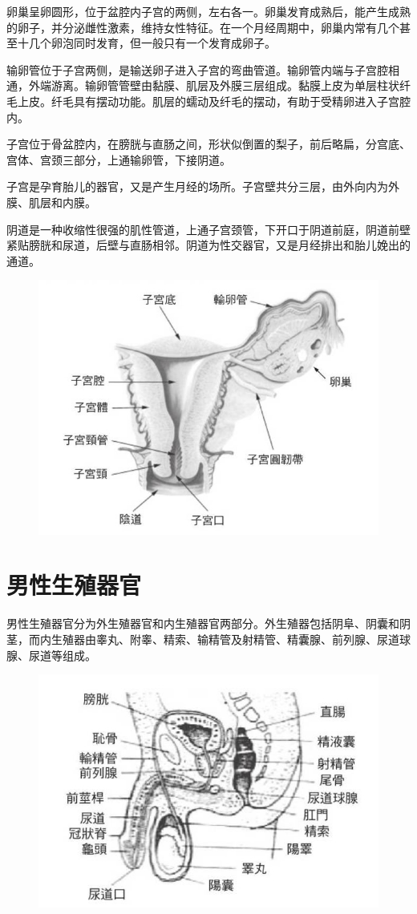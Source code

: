 \documentclass[12pt,UTF8]{ctexbook}
\begin{document}
卵巢呈卵圆形，位于盆腔内子宫的两侧，左右各一。卵巢发育成熟后，能产生成熟的卵子，并分泌雌性激素，维持女性特征。在一个月经周期中，卵巢内常有几个甚至十几个卵泡同时发育，但一般只有一个发育成卵子。

输卵管位于子宫两侧，是输送卵子进入子宫的弯曲管道。输卵管内端与子宫腔相通，外端游离。输卵管管壁由黏膜、肌层及外膜三层组成。黏膜上皮为单层柱状纤毛上皮。纤毛具有摆动功能。肌层的蠕动及纤毛的摆动，有助于受精卵进入子宫腔内。

子宫位于骨盆腔内，在膀胱与直肠之间，形状似倒置的梨子，前后略扁，分宫底、宫体、宫颈三部分，上通输卵管，下接阴道。

子宫是孕育胎儿的器官，又是产生月经的场所。子宫壁共分三层，由外向内为外膜、肌层和内膜。

阴道是一种收缩性很强的肌性管道，上通子宫颈管，下开口于阴道前庭，阴道前壁紧贴膀胱和尿道，后壁与直肠相邻。阴道为性交器官，又是月经排出和胎儿娩出的通道。

\begin{figure}[htbp]
	\centering
	\includegraphics[width=0.7\linewidth]{3}
	\caption{}
\end{figure}

\chapter{男性生殖器官}

男性生殖器官分为外生殖器官和内生殖器官两部分。外生殖器包括阴阜、阴囊和阴茎，而内生殖器由睾丸、附睾、精索、输精管及射精管、精囊腺、前列腺、尿道球腺、尿道等组成。

\begin{figure}[htbp]
	\centering
	\includegraphics[width=0.7\linewidth]{4}
	\caption{}
\end{figure}
\end{document}

